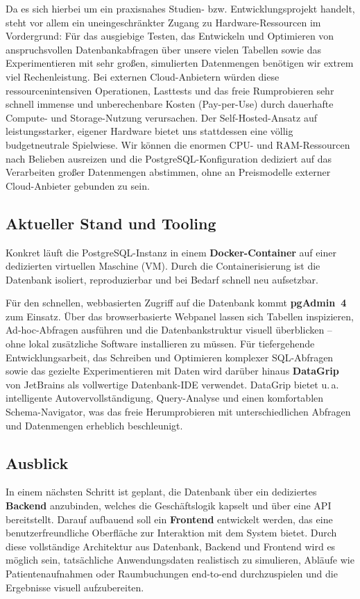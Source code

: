 Da es sich hierbei um ein praxisnahes Studien- bzw. Entwicklungsprojekt handelt, steht vor allem ein uneingeschränkter Zugang zu Hardware-Ressourcen im Vordergrund: Für das ausgiebige Testen, das Entwickeln und Optimieren von anspruchsvollen Datenbankabfragen über unsere vielen Tabellen sowie das Experimentieren mit sehr großen, simulierten Datenmengen benötigen wir extrem viel Rechenleistung. Bei externen Cloud-Anbietern würden diese ressourcenintensiven Operationen, Lasttests und das freie \glqq Rumprobieren\grqq{} sehr schnell immense und unberechenbare Kosten (Pay-per-Use) durch dauerhafte Compute- und Storage-Nutzung verursachen. Der Self-Hosted-Ansatz auf leistungsstarker, eigener Hardware bietet uns stattdessen eine völlig budgetneutrale Spielwiese. Wir können die enormen CPU- und RAM-Ressourcen nach Belieben ausreizen und die PostgreSQL-Konfiguration dediziert auf das Verarbeiten großer Datenmengen abstimmen, ohne an Preismodelle externer Cloud-Anbieter gebunden zu sein.

\subsection{Aktueller Stand und Tooling}

Konkret läuft die PostgreSQL-Instanz in einem \textbf{Docker-Container}\cite{Docker} auf einer dedizierten virtuellen Maschine (VM). Durch die Containerisierung ist die Datenbank isoliert, reproduzierbar und bei Bedarf schnell neu aufsetzbar.

Für den schnellen, webbasierten Zugriff auf die Datenbank kommt \textbf{pgAdmin~4}\cite{pgAdmin} zum Einsatz. Über das browserbasierte Webpanel lassen sich Tabellen inspizieren, Ad-hoc-Abfragen ausführen und die Datenbankstruktur visuell überblicken -- ohne lokal zusätzliche Software installieren zu müssen. Für tiefergehende Entwicklungsarbeit, das Schreiben und Optimieren komplexer SQL-Abfragen sowie das gezielte Experimentieren mit Daten wird darüber hinaus \textbf{DataGrip}\cite{DataGrip} von JetBrains als vollwertige Datenbank-IDE verwendet. DataGrip bietet u.\,a. intelligente Autovervollständigung, Query-Analyse und einen komfortablen Schema-Navigator, was das freie Herumprobieren mit unterschiedlichen Abfragen und Datenmengen erheblich beschleunigt.

\subsection{Ausblick}

In einem nächsten Schritt ist geplant, die Datenbank über ein dediziertes \textbf{Backend} anzubinden, welches die Geschäftslogik kapselt und über eine API bereitstellt. Darauf aufbauend soll ein \textbf{Frontend} entwickelt werden, das eine benutzerfreundliche Oberfläche zur Interaktion mit dem System bietet. Durch diese vollständige Architektur aus Datenbank, Backend und Frontend wird es möglich sein, tatsächliche Anwendungsdaten realistisch zu simulieren, Abläufe wie Patientenaufnahmen oder Raumbuchungen end-to-end durchzuspielen und die Ergebnisse visuell aufzubereiten.